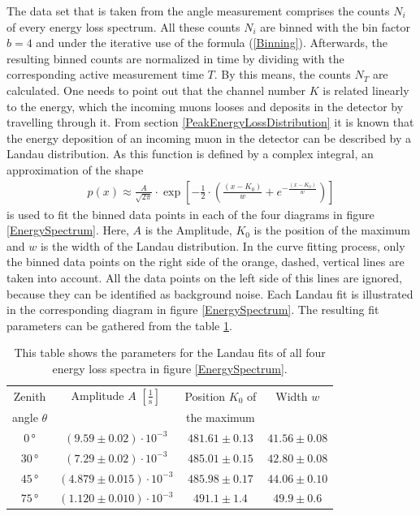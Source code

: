 \noindent The data set that is taken from the angle measurement comprises the counts $N_i$ of every energy loss spectrum.
All these counts $N_i$ are binned with the bin factor $b=4$ and under the iterative use of the formula (\ref{Binning}).
Afterwards, the resulting binned counts are normalized in time by dividing with the corresponding active measurement time $T$.
By this means, the counts $N_T$ are calculated.
One needs to point out that the channel number $K$ is related linearly to the energy, which the incoming muons looses and deposits in the detector by travelling through it.
From section \ref{PeakEnergyLossDistribution} it is known that the energy deposition of an incoming muon in the detector can be described by a Landau distribution.
As this function is defined by a complex integral, an approximation of the shape
\begin{align} \label{LandauDistribution}
p(x)\approx\frac{A}{\sqrt{2\pi}}\cdot\exp\left[-\frac{1}{2}\cdot\left(\frac{\left(x-K_0\right)}{w}+e^{-\frac{(x-K_0)}{w}}\right)\right]
\end{align}
\noindent is used to fit the binned data points in each of the four diagrams in figure \ref{EnergySpectrum}.
Here, $A$ is the Amplitude, $K_0$ is the position of the maximum and $w$ is the width of the Landau distribution.
In the curve fitting process, only the binned data points on the right side of the orange, dashed, vertical lines are taken into account.
All the data points on the left side of this lines are ignored, because they can be identified as background noise.
Each Landau fit is illustrated in the corresponding diagram in figure \ref{EnergySpectrum}.
The resulting fit parameters can be gathered from the table \ref{LandauFitParameters}.
\begin{table}[H]
	\centering
	\caption{This table shows the parameters for the Landau fits of all four energy loss spectra in figure \ref{EnergySpectrum}.}
	\begin{tabular}{|c|c|c|c|}
		Zenith & Amplitude $A$ $\left[\frac{1}{\text{s}}\right] $ & Position $K_0$ of & Width $w$ \\
		angle $\theta$ &  & the maximum &  \\
		\hline
		$0\,$° & $(9.59\pm 0.02)\cdot 10^{-3}$ & $481.61\pm 0.13$ & $41.56\pm 0.08$ \\
		\hline
		$30\,$° & $(7.29\pm 0.02)\cdot 10^{-3}$ & $485.01\pm 0.15$ & $42.80\pm 0.08$ \\
		\hline
		$45\,$° & $(4.879\pm 0.015)\cdot 10^{-3}$ & $485.98\pm 0.17$ & $44.06\pm 0.10$ \\
		\hline
		$75\,$° & $(1.120\pm 0.010)\cdot 10^{-3}$ & $491.1\pm 1.4$ & $49.9\pm 0.6$ \\
	\end{tabular}
	\label{LandauFitParameters}
\end{table}
